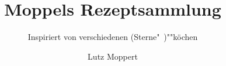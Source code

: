 \documentclass[fontsize=11pt, paper=a4, toc=index, DIV=12, BCOR=10mm]{scrbook}
\begin{document}
%
%
\subject{\textcolor{Mahogany}{Gute Küche ganz einfach}}
\title{\textcolor{Mahogany}{Moppels Rezeptsammlung}}
\subtitle{\textcolor{Mahogany}{Inspiriert von verschiedenen (Sterne"~)""köchen}}
\author{\textcolor{Mahogany}{Lutz Moppert}}
\date{}
\dedication{Gewidmet meiner geliebten Frau Uta und unseren fröhlichen Kindern
  Line und Tim, die alle Rezepte probiert und manchmal gelitten, es jedoch
  meist genossen haben.}
\maketitle
\newpage
\tableofcontents
%
%
\end{document}
